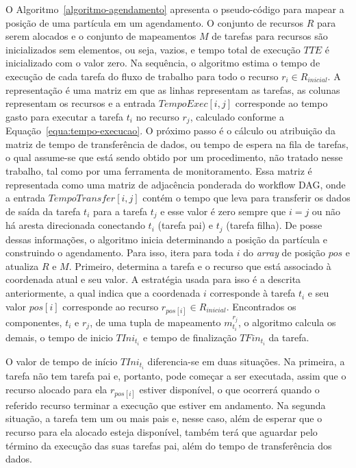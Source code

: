 \documentclass[sigconf]{acmart}
\begin{document}
O Algoritmo~\ref{algoritmo-agendamento} apresenta o pseudo-código para mapear a posição de uma partícula em um agendamento. O conjunto de recursos $R$ para serem alocados e o conjunto de mapeamentos $M$ de tarefas para recursos são inicializados sem elementos, ou seja, vazios, e tempo total de execução $TTE$ é inicializado com o valor zero. Na sequência, o algoritmo estima o tempo de execução de cada tarefa do fluxo de trabalho para todo o recurso ${r_i} \in {R_{inicial}}$. A representação é uma matriz em que as linhas representam as tarefas, as colunas representam os recursos e a entrada $ TempoExec[i,j] $ corresponde ao tempo gasto para executar a tarefa $t_i$ no recurso $r_j$, calculado conforme a Equação~\ref{equa:tempo-execucao}. O próximo passo é o cálculo ou atribuição da matriz de tempo de transferência de dados, ou tempo de espera na fila de tarefas, o qual assume-se que está sendo obtido por um procedimento, não tratado nesse trabalho, tal como por uma ferramenta de monitoramento. Essa matriz é representada como uma matriz de adjacência ponderada do workflow DAG, onde a entrada $ TempoTransfer[i, j]$ contém o tempo que leva para transferir os dados de saída da tarefa $t_i$ para a tarefa $t_j$ e esse valor é zero sempre que $i =j$ ou não há aresta direcionada conectando $t_i$ (tarefa pai) e $t_j$ (tarefa filha). 
De posse dessas informações, o algoritmo inicia determinando a posição da partícula e construindo o agendamento. Para isso, itera para toda $ i $ do \textit{array} de posição $pos$ e atualiza $ R $ e $ M $. Primeiro, determina a tarefa e o recurso que está associado à coordenada atual e seu valor. A estratégia usada para isso é a descrita anteriormente, a qual indica que a coordenada $ i $ corresponde à tarefa $t_i$ e seu valor $pos[i]$ corresponde ao recurso $  {r_{pos[i]}} \in {R_{inicial}} $. Encontrados os componentes, $ {t_i} $ e $ {r_j} $, de uma tupla de mapeamento $ m_{{t_i}}^{{r_j}} $, o algoritmo calcula os demais, o tempo de inicio $ TIn{i_{{t_i}}} $ e tempo de finalização $TFi{n_{{t_i}}}$ da tarefa.

O valor de tempo de início $ TIn{i_{{t_i}}} $ diferencia-se em duas situações. Na primeira, a tarefa não tem tarefa pai e, portanto, pode começar a ser executada, assim que o recurso alocado para ela $r_{pos[i]}$ estiver disponível, o que ocorrerá quando o referido recurso terminar a execução que estiver em andamento. Na segunda situação, a tarefa tem um ou mais pais e, nesse caso, além de esperar que o recurso para ela alocado esteja disponível, também terá que aguardar pelo término da execução das suas tarefas pai, além do tempo de transferência dos dados.
\end{document}
